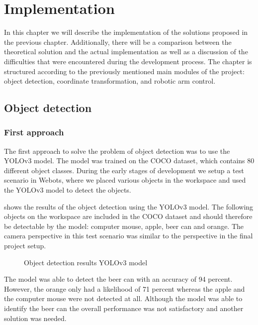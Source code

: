\chapter{Implementation} %

\label{implementation} %


In this chapter we will describe the implementation of the solutions proposed in the previous chapter. Additionally, there will be a comparison between the theoretical solution and the actual implementation as well as a discussion of the difficulties that were encountered during the development process. The chapter is structured according to the previously mentioned main modules of the project: object detection, coordinate transformation, and robotic arm control.
\section{Object detection}

\subsection{First approach}
The first approach to solve the problem of object detection was to use the YOLOv3 model. The model was trained on the COCO dataset, which contains 80 different object classes. During the early stages of development we setup a test scenario in Webots, where we placed various objects in the workspace and used the YOLOv3 model to detect the objects. 

 shows the results of the object detection using the YOLOv3 model. The following objects on the workspace are included in the COCO dataset and should therefore be detectable by the model: computer mouse, apple, beer can and orange. The camera perspective in this test scenario was similar to the perspective in the final project setup.  

\begin{figure}[!h]
    \centering
    \caption{Object detection results YOLOv3 model }
    \label{fig:object_detection_results}
\end{figure}


The model was able to detect the beer can with an accuracy of 94 percent. However, the orange only had a likelihood of 71 percent whereas the apple and the computer mouse were not detected at all. Although the model was able to identify the beer can the overall performance was not satisfactory and another solution was needed.

